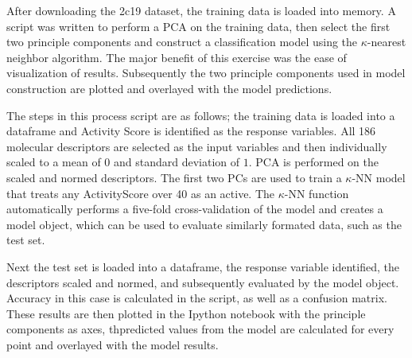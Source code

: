 After downloading the 2c19 dataset, the training data is loaded into memory. A script was written to perform a PCA on the training data, then select the first two principle components and construct a classification model using the $\kappa$-nearest neighbor algorithm. The major benefit of this exercise was the ease of visualization of results. Subsequently the two principle components used in model construction are plotted and overlayed with the model predictions.

The steps in this process script are as follows; the training data is loaded into a dataframe and Activity Score is identified as the response variables. All 186 molecular descriptors are selected as the input variables and then individually scaled to a mean of $0$ and standard deviation of $1$. PCA is performed on the scaled and normed descriptors. The first two PCs are used to train a $\kappa$-NN model that treats any ActivityScore over 40 as an active. The $\kappa$-NN function automatically performs a five-fold cross-validation of the model and creates a model object, which can be used to evaluate similarly formated data, such as the test set.

Next the test set is loaded into a dataframe, the response variable identified, the descriptors scaled and normed, and subsequently evaluated by the model object. Accuracy in this case is calculated in the script, as well as a confusion matrix. These results are then plotted in the Ipython notebook with the principle components as axes, thpredicted values from the model are calculated for every point and overlayed with the model results.

